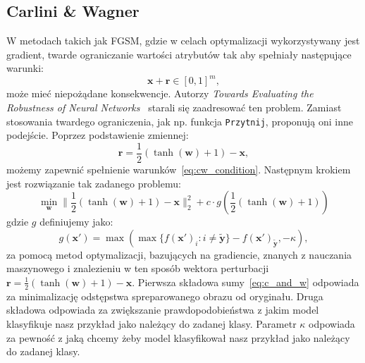\documentclass[
    left=2.5cm,         %
    right=2.5cm,        %
    top=2.5cm,          %
    bottom=3cm,         %
    bindingoffset=6mm,  %
    nohyphenation=false %
]{eiti/eiti-thesis}
\renewcommand{\vec}[1]{\mathbf{#1}}
\newcommand{\function}[1]{\texttt{#1}}
\begin{document}
\subsection{Carlini \& Wagner}
W metodach takich jak FGSM, gdzie w celach optymalizacji wykorzystywany jest gradient, twarde ograniczanie wartości atrybutów
tak aby spełniały następujące warunki:
\begin{equation}\label{eq:cw_condition}
    \vec{x}+\vec{r} \in [0,1]^m,
\end{equation}
może mieć niepożądane konsekwencje.
Autorzy \textit{Towards Evaluating the Robustness of Neural Networks}~\cite{DBLP:journals/corr/CarliniW16a} starali się zaadresować ten problem.
Zamiast stosowania twardego ograniczenia, jak np. funkcja \function{Przytnij}, proponują oni inne podejście.
Poprzez podstawienie zmiennej:
\begin{equation}
    \vec{r} = \frac{1}{2}(\tanh(\vec{w})+1) - \vec{x},
\end{equation}
możemy zapewnić spełnienie warunków~\eqref{eq:cw_condition}.
Następnym krokiem jest rozwiązanie tak zadanego problemu:
\begin{equation}\label{eq:c_and_w}
\min_{\vec{w}}\| \frac { 1 } { 2 } ( \tanh ( \vec{w} ) + 1 ) - \vec{x} \| _ { 2 } ^ { 2 } + c \cdot g ( \frac { 1 } { 2 } ( \tanh ( \vec{w} ) + 1 ) )
\end{equation}
gdzie $g$ definiujemy jako:
\begin{equation}
    g ( \vec{x'} ) = \max ( \max \{ f ( \vec{x'} ) _ { i } : i \neq \vec{\widetilde{y}} \} - f ( \vec{x'} ) _ { \vec{\widetilde{y}} } , - \kappa),
\end{equation}
za pomocą metod optymalizacji, bazujących na gradiencie, znanych z nauczania maszynowego i znalezieniu w ten sposób wektora
perturbacji $\vec{r} = \frac{1}{2}(\tanh(\vec{w})+1) - \vec{x}$.
Pierwsza składowa sumy~\eqref{eq:c_and_w} odpowiada za minimalizację odstępstwa spreparowanego obrazu
od oryginału. Druga składowa odpowiada za zwiększanie prawdopodobieństwa z jakim model klasyfikuje nasz przykład
jako należący do zadanej klasy. Parametr \(\kappa\) odpowiada za pewność z jaką chcemy żeby model klasyfikował nasz
przykład jako należący do zadanej klasy.


\end{document}
